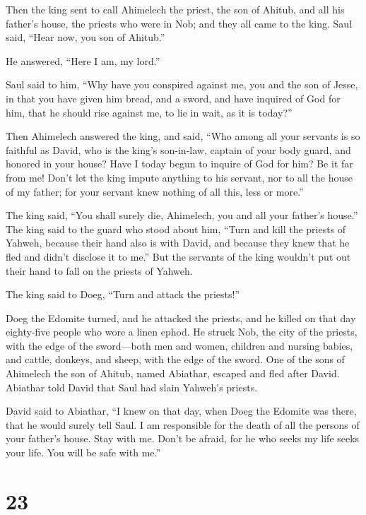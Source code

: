  Then the king sent to call Ahimelech the priest, the son
of Ahitub, and all his father's house, the priests who were in Nob; and
they all came to the king.  Saul said, ``Hear now, you
son of Ahitub.''

He answered, ``Here I am, my lord.''

 Saul said to him, ``Why have you conspired against me,
you and the son of Jesse, in that you have given him bread, and a sword,
and have inquired of God for him, that he should rise against me, to lie
in wait, as it is today?''

 Then Ahimelech answered the king, and said, ``Who among
all your servants is so faithful as David, who is the king's son-in-law,
captain of your body guard, and honored in your house? 
Have I today begun to inquire of God for him? Be it far from me! Don't
let the king impute anything to his servant, nor to all the house of my
father; for your servant knew nothing of all this, less or more.''

 The king said, ``You shall surely die, Ahimelech, you
and all your father's house.''  The king said to the
guard who stood about him, ``Turn and kill the priests of Yahweh,
because their hand also is with David, and because they knew that he
fled and didn't disclose it to me.'' But the servants of the king
wouldn't put out their hand to fall on the priests of Yahweh.

 The king said to Doeg, ``Turn and attack the priests!''

Doeg the Edomite turned, and he attacked the priests, and he killed on
that day eighty-five people who wore a linen ephod.  He
struck Nob, the city of the priests, with the edge of the sword---both
men and women, children and nursing babies, and cattle, donkeys, and
sheep, with the edge of the sword.  One of the sons of
Ahimelech the son of Ahitub, named Abiathar, escaped and fled after
David.  Abiathar told David that Saul had slain Yahweh's
priests.

 David said to Abiathar, ``I knew on that day, when Doeg
the Edomite was there, that he would surely tell Saul. I am responsible
for the death of all the persons of your father's house. 
Stay with me. Don't be afraid, for he who seeks my life seeks your life.
You will be safe with me.''

\hypertarget{section-22}{%
\section{23}\label{section-22}}

